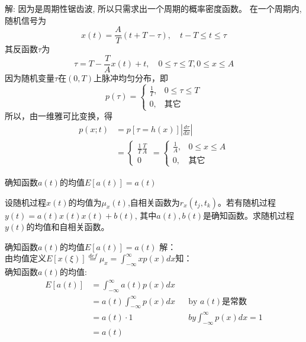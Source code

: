 \begin{frame}
解: 因为是周期性锯齿波, 所以只需求出一个周期的概率密度函数。
在一个周期内,随机信号为
\[x(t)=\frac{A}{T}(t+T-\tau),\quad t-T\le t\le\tau \]
其反函数$\tau$为
\[\tau=T-\frac{T}{A}x(t)+t,\quad 0\le\tau\le T,0\le x\le A \]
因为随机变量$\tau$在$(0,T)$上脉冲均匀分布，即
\[
p(\tau)=\begin{cases}
\frac{1}{T},&0\le\tau\le T\\
0,&\text{其它}
\end{cases} 
\]
所以，由一维雅可比变换，得
\begin{align*}
p(x;t)&=p[\tau=h(x)]\left|\frac{d\tau}{dx}\right|\\
&=\begin{cases}
\frac{1}{T}\frac{T}{A}\\
0
\end{cases}
=\begin{cases}
\frac{1}{A}, &0\le x\le A\\
0,&\text{其它}
\end{cases}
\end{align*}
\end{frame}

\begin{frame}{确知函数$a(t)$的均值$E[a(t)]=a(t)$}
\begin{example}
设随机过程$x(t)$的均值为$\mu_x(t)$,自相关函数为$r_x(t_j,t_k)$。若有随机过程$y(t)=a(t)x(t)x(t)+b(t)$, 其中$a(t),b(t)$是确知函数。求随机过程$y(t)$的均值和自相关函数。
\end{example}
\end{frame}

\begin{frame}{确知函数$a(t)$的均值$E[a(t)]=a(t)$}
解：\\
由均值定义$E[x(\xi)]\mathop{=}\limits^{def}\mu_x=\int_{-\infty}^{\infty}xp(x)dx$知：\\
确知函数$a(t)$的均值:
\begin{align*}
E[a(t)]&=\int_{-\infty}^{\infty}a(t)p(x)dx\\
&=a(t)\int_{-\infty}^{\infty}p(x)dx &&\text{by $a(t)$是常数}\\
&=a(t)\cdot 1 &&by \int_{-\infty}^{\infty}p(x)dx=1\\
&=a(t)
\end{align*}
\end{frame}

